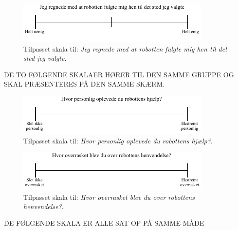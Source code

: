 \noindent
% 
%
\begin{figure}[H]
\centering
\includegraphics[width =\textwidth]{Figure/TilpasningAfSkalaer/TilpassetRobottenFulgteMigDetRigtigeStedHen} 
\caption{Tilpasset skala til: \textit{Jeg regnede med at robotten fulgte mig hen til det sted jeg valgte}.}
\label{fig:TilpasningRobottenFulgte}
\end{figure}
\noindent
%
DE TO FØLGENDE SKALAER HØRER TIL DEN SAMME GRUPPE OG SKAL PRÆSENTERES PÅ DEN SAMME SKÆRM.
%
\begin{figure}[H]
\centering
\includegraphics[width =\textwidth]{Figure/TilpasningAfSkalaer/TilpassetPersonligHjaelp} 
\caption{Tilpasset skala til: \textit{Hvor personlig oplevede du robottens hjælp?}.}
\label{fig:TilpasningPersonligHjaelp}
\end{figure}
\noindent
%
%
\begin{figure}[H]
\centering
\includegraphics[width =\textwidth]{Figure/TilpasningAfSkalaer/TilpassetOverrasketOverR} 
\caption{Tilpasset skala til: \textit{Hvor overrasket blev du over robottens henvendelse?}.}
\label{fig:TilpasningOverrasketOverR}
\end{figure}
\noindent
%  
DE FØLGENDE SKALA ER ALLE SAT OP PÅ SAMME MÅDE  
%
